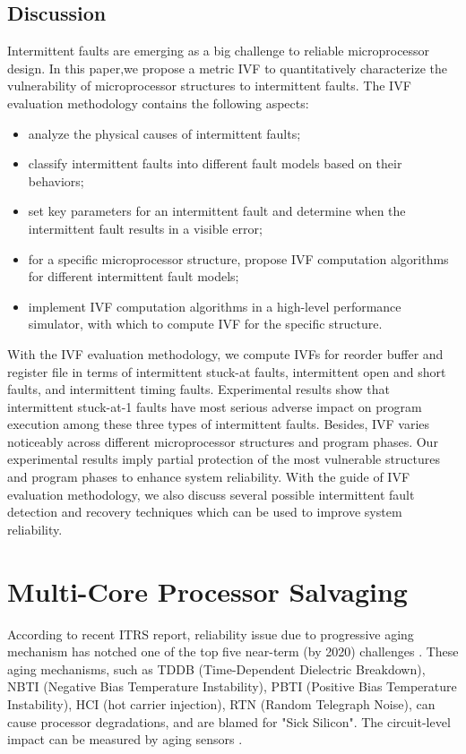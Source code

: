 \subsection{Discussion}
Intermittent faults are emerging as a big challenge to reliable microprocessor design. In this paper,we propose a metric IVF to quantitatively characterize the vulnerability of microprocessor structures to intermittent faults. The IVF evaluation methodology contains the following aspects:
\begin{itemize}
    \item analyze the physical causes of intermittent faults;
    \item classify intermittent faults into different fault models based on their behaviors;
    \item set key parameters for an intermittent fault and determine when the intermittent fault results in a visible error;
    \item for a specific microprocessor structure, propose IVF computation algorithms for different intermittent fault models;
    \item implement IVF computation algorithms in a high-level performance simulator, with which to compute IVF for the specific structure.
\end{itemize}

With the IVF evaluation methodology, we compute IVFs for reorder buffer and register file in terms of intermittent stuck-at faults, intermittent open and short faults, and intermittent timing faults. Experimental results show that intermittent stuck-at-1 faults have most serious adverse impact on program execution among these three types of intermittent faults. Besides, IVF varies noticeably across different microprocessor structures and program phases. Our experimental results imply partial protection of the most vulnerable structures and program phases to enhance system reliability. With the guide of IVF evaluation methodology, we also discuss several possible intermittent fault detection and recovery techniques which can be used to improve system reliability.

\section{Multi-Core Processor Salvaging}
According to recent ITRS report, reliability issue due to progressive aging mechanism has notched one of the top five near-term (by 2020) challenges  \cite{itrs13}. These aging mechanisms, such as TDDB (Time-Dependent Dielectric Breakdown), NBTI (Negative Bias Temperature Instability), PBTI (Positive Bias Temperature Instability), HCI (hot carrier injection), RTN (Random Telegraph Noise),  can cause processor degradations, and are blamed for "Sick Silicon". The circuit-level impact can be measured by aging sensors \cite{siliconodometer} \cite{yan2010svfd}.

